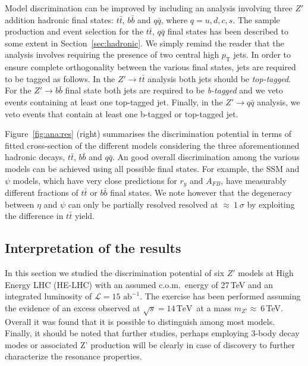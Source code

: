 \documentclass[a4paper,11pt]{article}
\newcommand{\pt}{\ensuremath{p_{\text{T}}}}
\newcommand*{\intlumihelhc}{\ensuremath{\mathcal{L}=15\,\text{ab}^{-1}}}
\newcommand*{\com}{c.o.m.~}
\newcommand*{\sqrtslhc}{\ensuremath{\sqrt{s}=14\,\text{TeV}}}
\renewcommand*{\intlumihelhc}{\ensuremath{\mathcal{L}=15\text{ ab}^{-1}}}
\begin{document}
Model discrimination can be improved by including an analysis involving three $Z'$ addition hadronic final states: $t\bar{t}$, $b\bar{b}$ and $q\bar{q}$, where $q=u,d,c,s$. The sample production and event selection for the $t\bar{t}$, $q\bar{q}$ final states has been described to some extent in Section~\ref{sec:hadronic}. We simply remind the reader that the analysis involves requiring the presence of two central high $\pt$ jets. In order to ensure complete orthogonality between the various final states, jets are required to be tagged as follows. In the $Z' \rightarrow t\bar{t}$ analysis both jets should be \emph{top-tagged}. For the $Z' \rightarrow b\bar{b}$ final state both jets are required to be \emph{b-tagged} and we veto events containing at least one top-tagged jet. Finally, in the $Z' \rightarrow q\bar{q}$ analysis, we veto events that contain at least one b-tagged or top-tagged jet.

Figure~\ref{fig:ana:res} (right) summarises the discrimination potential in terms of fitted cross-section of the different models considering the three aforementionned hadronic decays, $t\bar{t}$,  $b\bar{b}$ and $q\bar{q}$. An good overall discrimination among the various models can be achieved using all possible final states. For example, the SSM and $\psi$ models, which have very close predictions for $r_y$ and $A_{FB}$, have measurably different fractions of $t\bar{t}$ or $b\bar{b}$ final states. We note however that the degeneracy between $\eta$ and $\psi$ can only be partially resolved resolved at $\approx~1~\sigma$ by exploiting the difference in $t\bar{t}$ yield.

\subsection{Interpretation of the results}
In this section we studied the discrimination potential of six $Z'$ models at High Energy LHC (HE-LHC) with an assumed \com energy of 27\,TeV and an integrated luminosity of \intlumihelhc. The exercise has been performed assuming the evidence of an excess observed at \sqrtslhc\ at a mass $m_{Z'}\approx~6$\,TeV. Overall it was found that it is possible to distinguish among most models. Finally, it should be noted that further studies, perhaps employing 3-body decay modes or associated Z' production will be clearly in case of discovery to further characterize the resonance properties.
\end{document}
